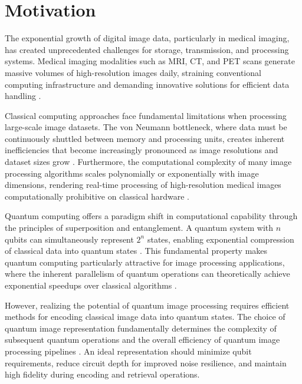 \documentclass{ipol}
\begin{document}

\section{Motivation}\label{sec:motivation}

The exponential growth of digital image data, particularly in medical imaging, has created unprecedented challenges for storage, transmission, and processing systems. Medical imaging modalities such as MRI, CT, and PET scans generate massive volumes of high-resolution images daily, straining conventional computing infrastructure and demanding innovative solutions for efficient data handling \cite{bib43}.

Classical computing approaches face fundamental limitations when processing large-scale image datasets. The von Neumann bottleneck, where data must be continuously shuttled between memory and processing units, creates inherent inefficiencies that become increasingly pronounced as image resolutions and dataset sizes grow \cite{bib44}. Furthermore, the computational complexity of many image processing algorithms scales polynomially or exponentially with image dimensions, rendering real-time processing of high-resolution medical images computationally prohibitive on classical hardware \cite{bib45}.

Quantum computing offers a paradigm shift in computational capability through the principles of superposition and entanglement. A quantum system with $n$ qubits can simultaneously represent $2^n$ states, enabling exponential compression of classical data into quantum states \cite{bib2}. This fundamental property makes quantum computing particularly attractive for image processing applications, where the inherent parallelism of quantum operations can theoretically achieve exponential speedups over classical algorithms \cite{bib12}.

However, realizing the potential of quantum image processing requires efficient methods for encoding classical image data into quantum states. The choice of quantum image representation fundamentally determines the complexity of subsequent quantum operations and the overall efficiency of quantum image processing pipelines \cite{bib14}. An ideal representation should minimize qubit requirements, reduce circuit depth for improved noise resilience, and maintain high fidelity during encoding and retrieval operations.
\end{document}

